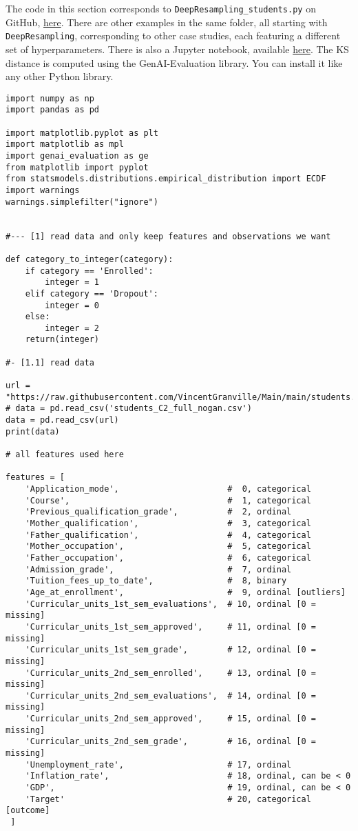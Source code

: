 \documentclass[oneside,10pt]{book}
\begin{document}
The code in this section corresponds to \texttt{DeepResampling\_students.py} on GitHub, \href{https://github.com/VincentGranville/Main/blob/main/DeepResampling_students.py}{here}. There are other examples in the same folder, all starting with \texttt{DeepResampling}, corresponding to
 other case studies, each featuring a different set of hyperparameters. There is also a Jupyter notebook, available 
 \href{https://github.com/VincentGranville/Notebooks/blob/main/DeepResampling.ipynb}{here}. The KS distance is computed using the
 GenAI-Evaluation library. You can install it like any other Python library.


\vspace{1ex}

\begin{lstlisting}
import numpy as np
import pandas as pd

import matplotlib.pyplot as plt
import matplotlib as mpl
import genai_evaluation as ge
from matplotlib import pyplot
from statsmodels.distributions.empirical_distribution import ECDF
import warnings
warnings.simplefilter("ignore")


#--- [1] read data and only keep features and observations we want

def category_to_integer(category):
    if category == 'Enrolled':
        integer = 1
    elif category == 'Dropout':
        integer = 0
    else:
        integer = 2
    return(integer)

#- [1.1] read data

url = "https://raw.githubusercontent.com/VincentGranville/Main/main/students.csv"
# data = pd.read_csv('students_C2_full_nogan.csv')
data = pd.read_csv(url)
print(data)

# all features used here

features = [
    'Application_mode',                      #  0, categorical
    'Course',                                #  1, categorical
    'Previous_qualification_grade',          #  2, ordinal
    'Mother_qualification',                  #  3, categorical
    'Father_qualification',                  #  4, categorical
    'Mother_occupation',                     #  5, categorical
    'Father_occupation',                     #  6, categorical
    'Admission_grade',                       #  7, ordinal
    'Tuition_fees_up_to_date',               #  8, binary
    'Age_at_enrollment',                     #  9, ordinal [outliers]
    'Curricular_units_1st_sem_evaluations',  # 10, ordinal [0 = missing]
    'Curricular_units_1st_sem_approved',     # 11, ordinal [0 = missing]
    'Curricular_units_1st_sem_grade',        # 12, ordinal [0 = missing]
    'Curricular_units_2nd_sem_enrolled',     # 13, ordinal [0 = missing]
    'Curricular_units_2nd_sem_evaluations',  # 14, ordinal [0 = missing]
    'Curricular_units_2nd_sem_approved',     # 15, ordinal [0 = missing]
    'Curricular_units_2nd_sem_grade',        # 16, ordinal [0 = missing]
    'Unemployment_rate',                     # 17, ordinal
    'Inflation_rate',                        # 18, ordinal, can be < 0
    'GDP',                                   # 19, ordinal, can be < 0
    'Target'                                 # 20, categorical [outcome]
 ]


\end{lstlisting}
\end{document}
